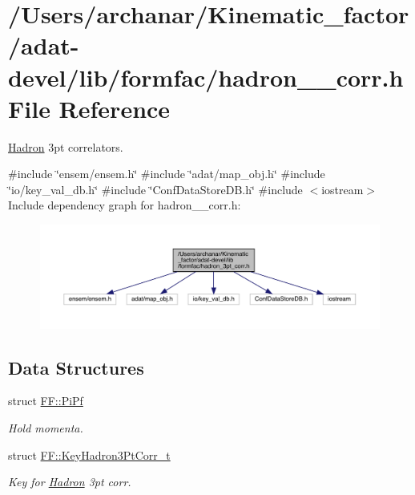 \hypertarget{adat-devel_2lib_2formfac_2hadron__3pt__corr_8h}{}\section{/\+Users/archanar/\+Kinematic\+\_\+factor/adat-\/devel/lib/formfac/hadron\+\_\+3pt\+\_\+corr.h File Reference}
\label{adat-devel_2lib_2formfac_2hadron__3pt__corr_8h}


\mbox{\hyperlink{namespaceHadron}{Hadron}} 3pt correlators.  


{\ttfamily \#include \char`\"{}ensem/ensem.\+h\char`\"{}}\newline
{\ttfamily \#include \char`\"{}adat/map\+\_\+obj.\+h\char`\"{}}\newline
{\ttfamily \#include \char`\"{}io/key\+\_\+val\+\_\+db.\+h\char`\"{}}\newline
{\ttfamily \#include \char`\"{}Conf\+Data\+Store\+D\+B.\+h\char`\"{}}\newline
{\ttfamily \#include $<$iostream$>$}\newline
Include dependency graph for hadron\+\_\+3pt\+\_\+corr.\+h\+:
\nopagebreak
\begin{figure}[H]
\begin{center}
\leavevmode
\includegraphics[width=350pt]{d9/dd0/adat-devel_2lib_2formfac_2hadron__3pt__corr_8h__incl}
\end{center}
\end{figure}
\subsection*{Data Structures}
\begin{DoxyCompactItemize}
\item 
struct \mbox{\hyperlink{structFF_1_1PiPf}{F\+F\+::\+Pi\+Pf}}
\begin{DoxyCompactList}\small\item\em Hold momenta. \end{DoxyCompactList}\item 
struct \mbox{\hyperlink{structFF_1_1KeyHadron3PtCorr__t}{F\+F\+::\+Key\+Hadron3\+Pt\+Corr\+\_\+t}}
\begin{DoxyCompactList}\small\item\em Key for \mbox{\hyperlink{namespaceHadron}{Hadron}} 3pt corr. \end{DoxyCompactList}\end{DoxyCompactItemize}
